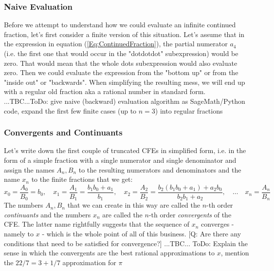 \subsubsection{Naive Evaluation}
Before we attempt to understand how we could evaluate an infinite continued fraction, let's first consider a finite version of this situation. Let's assume that in the expression in equation (\ref{Eq:ContinuedFraction}), the partial numerator $a_4$ (i.e. the first one that would occur in the "dotdotdot" subexpression) would be zero. That would mean that the whole dots subexpression would also evaluate zero. Then we could evaluate the expression from the "bottom up" or from the "inside out" or "backwards". When simplifying the resulting mess, we will end up with a regular old fraction aka a rational number in standard form. ...TBC...ToDo: give naive (backward) evaluation algorithm as SageMath/Python code, expand the first few finite cases (up to $n=3$) into regular fractions



\subsubsection{Convergents and Continuants}
Let's write down the first couple of truncated CFEs in simplified form, i.e. in the form of a simple fraction with a single numerator and single denominator and assign the names $A_n, B_n$ to the resulting numerators and denominators and the name $x_n$ to the finite fractions that we get:
\begin{equation}
\label{Eq:ContinuantsAndConvergents}
x_0 = \frac{A_0}{B_0} = b_0, \quad
x_1 = \frac{A_1}{B_1} = \frac{b_1 b_0 + a_1}{b_1}, \quad
x_2 = \frac{A_2}{B_2} = \frac{b_2(b_1 b_0 + a_1) + a_2 b_0}{b_2 b_1 + a_2}, \quad
\ldots \quad
x_n = \frac{A_n}{B_n}
\end{equation}
The numbers $A_n, B_n$ that we can create in this way are called the $n$-th order \emph{continuants} and the numbers $x_n$ are called the $n$-th order \emph{convergents} of the CFE. The latter name rightfully suggests that the sequence of $x_n$ converges - namely to $x$ - which is the whole point of all of this business. [Q: Are there any conditions that need to be satisfied for convergence?] ...TBC... ToDo: Explain the sense in which the convergents are the best rational approximations to $x$, mention the $22/7 = 3 + 
1/7$ approximation for $\pi$


